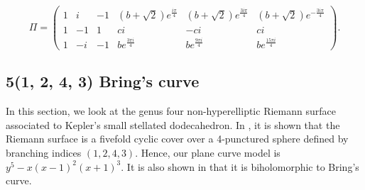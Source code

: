 \documentclass[12pt,reqno]{amsart}
\newtheorem{theorem}{Theorem}
\newtheorem{lemma}[theorem]{Lemma}
\theoremstyle{definition}
\theoremstyle{remark}
\begin{document}
$$\Pi = \begin{pmatrix} 1 & i & -1 & (b + \sqrt{2}) e^{\frac{i \pi }{4}} & (b + \sqrt{2}) e^{\frac{3 i \pi }{4}} & (b + \sqrt{2}) e^{-\frac{3 i \pi }{4}} \\
 1 & -1 & 1 & c i & -c i & c i \\
 1 & -i & -1 & b e^{\frac{3 \pi i}{4}} & b e^{\frac{9 \pi i}{4}} & b e^{\frac{15 \pi i}{4}}\end{pmatrix}.$$ 
 
 








\subsection*{5(1, 2, 4, 3) Bring's curve}

In this section, we look at the genus four non-hyperelliptic Riemann surface associated to Kepler's small stellated dodecahedron. In \cite{matti}, it is shown that the Riemann surface is a fivefold cyclic cover over a 4-punctured sphere defined by branching indices $(1, 2, 4, 3).$ Hence, our plane curve model is $y^5 - x(x - 1)^2(x + 1)^3.$ It is also shown in \cite{matti} that it is biholomorphic to Bring's curve. 
\end{document}
